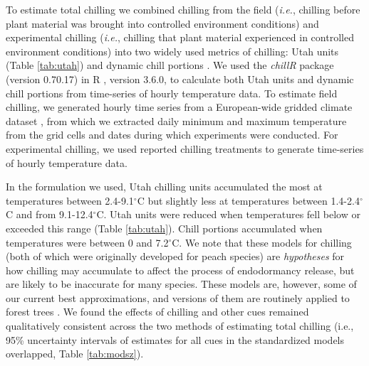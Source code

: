 \documentclass{article}
\begin{document}
\par To estimate total chilling we combined chilling from the field (\emph{i.e.}, chilling before plant material was brought into controlled environment conditions) and experimental chilling (\emph{i.e.}, chilling that plant material experienced in controlled environment conditions) into two widely used metrics of chilling: Utah units (Table \ref{tab:utah}) and dynamic chill portions \emph{\citep{dennis2003,Luedeling:2011qe}}. We used the \textit{chillR} package (version 0.70.17) in R \emph{\citep{Rcore:2017, chillR2019}}, version 3.6.0, to calculate both Utah units and dynamic chill portions from time-series of hourly temperature data. To estimate field chilling, we generated hourly time series from a European-wide gridded climate dataset \emph{\citep{cornes2018}}, from which we extracted daily minimum and maximum temperature from the grid cells and dates during which experiments were conducted. For experimental chilling, we used reported chilling treatments to generate time-series of hourly temperature data.
\par In the formulation we used, Utah chilling units accumulated the most at temperatures between 2.4-9.1$^{\circ}$C but slightly less at temperatures between 1.4-2.4$^{\circ}$C and from 9.1-12.4$^{\circ}$C. Utah units were reduced when temperatures fell below or exceeded this range (Table \ref{tab:utah}). Chill portions accumulated when temperatures were between 0 and 7.2$^{\circ}$C. We note that these models for chilling (both of which were originally developed for peach species) are \emph{hypotheses} for how chilling may accumulate to affect the process of endodormancy release, but are likely to be inaccurate for many species. These models are, however, some of our current best approximations, and versions of them are routinely applied to forest trees \emph{\citep[e.g.,][]{Harrington:2010}}. We found the effects of chilling and other cues remained qualitatively consistent across the two methods of estimating total chilling (i.e., 95\% uncertainty intervals of estimates for all cues in the standardized models overlapped, Table \ref{tab:modsz}).
\end{document}
